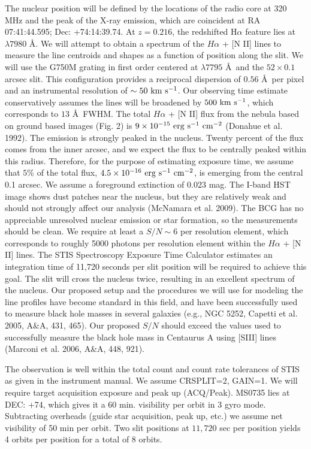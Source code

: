 \documentclass[12pt]{article}
\begin{document}
The nuclear position will be defined by the locations of the radio core at 320 MHz and the peak of the X-ray emission,
which are coincident at RA 07:41:44.595; Dec: +74:14:39.74.  At $z=0.216$, the redshifted H$\alpha$ feature lies at $\lambda 7980$ \AA.  We will 
attempt to obtain a spectrum of the $H\alpha$ + [N II] lines to measure the line centroids and shapes as
a function of position along the slit.  We will use
the G750M grating in first order centered at $\lambda 7795$ \AA\ and the $52\times 0.1$ arcsec slit. 
 This configuration provides a reciprocal dispersion of $0.56$ \AA\ per pixel and an instrumental resolution of $\sim 50~\rm km~s^{-1}$.  Our observing time estimate conservatively assumes the lines will be broadened by $500~\rm km~s^{-1}$,
 which corresponds to $13$ \AA\ FWHM.   The total $H\alpha$ + [N II]  flux from the nebula based on ground based images (Fig. 2)
is $9\times 10^{-15}~\rm erg~s^{-1}~cm^{-2}$ (Donahue et al. 1992).  The emission is strongly peaked in the nucleus. Twenty percent of the flux comes from the inner arcsec, and we expect the flux to be centrally peaked within this radius.  Therefore, for the purpose
of estimating exposure time, we assume that $5\%$ of the total flux, $4.5\times 10^{-16}~\rm erg~s^{-1}~cm^{-2}$, is emerging from the central 0.1 arcsec.  We assume a foreground extinction of $0.023$ mag.  The I-band HST image
shows dust patches near the nucleus, but they are relatively weak and should not strongly affect our analysis (McNamara
et al. 2009).  The BCG has no appreciable unresolved nuclear emission or star formation, so the measurements should
be clean.   We require at least
a $S/N\sim 6$ per resolution element, which corresponds to roughly 5000 photons per resolution element within
the $H\alpha$ + [N II] lines.  The STIS Spectroscopy Exposure Time Calculator estimates an integration time of 11,720 seconds per slit position will be required to achieve this goal.  The slit will cross the nucleus twice, resulting in an excellent spectrum
of the nucleus.   Our proposed setup and the procedures we will use for modeling the line profiles have become standard in this field, and have been successfully used to
measure black hole masses in several galaxies (e.g., NGC 5252, Capetti et al. 2005, A\&A, 431, 465).  Our
proposed $S/N$ should exceed the values used to successfully measure the black hole mass in Centaurus A using
[SIII] lines (Marconi et al. 2006, A\&A, 448, 921).

 
The observation is well within the total count and count rate tolerances of STIS as given in the instrument manual.  
We assume CRSPLIT=2, GAIN=1.  We will require target acquisition exposure and peak up (ACQ/Peak).  MS0735
lies at DEC: +74, which gives it a 60 min. visibility per orbit in 3 gyro mode.  Subtracting overheads (guide star
acquisition, peak up, etc.) we assume net visibility of 50 min per orbit.  Two slit positions at $11, 720$ sec per position
yields 4 orbits per position for a total of 8 orbits.
\end{document}
